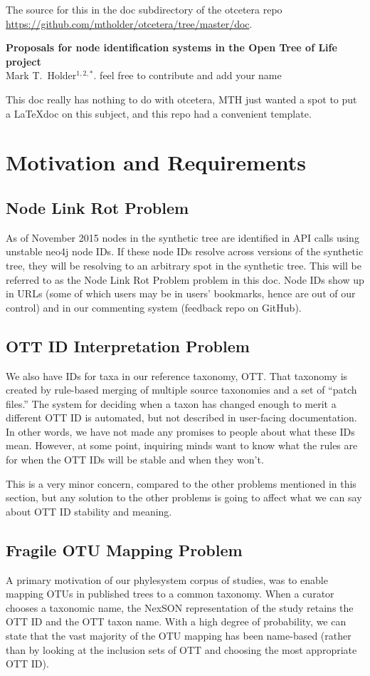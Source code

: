 \documentclass[11pt]{article}
\newcommand{\nodeLinkRot}{Node Link Rot Problem\xspace}
\newcommand{\ottIdInterpretation}{OTT ID Interpretation Problem\xspace}
\newcommand{\fragileOTUMapping}{Fragile OTU Mapping Problem\xspace}
\begin{document}
The source for this in the doc subdirectory of the otcetera
    repo \url{https://github.com/mtholder/otcetera/tree/master/doc}.
\begin{center}
    {\bf Proposals for node identification systems in the Open Tree of Life project} \\
{Mark T.~Holder$^{1,2,\ast}$. feel free to contribute and add your name}
\end{center}
This doc really has nothing to do with otcetera, MTH just wanted a spot to
put a \LaTeX doc on this subject, and this repo had a convenient template.

\tableofcontents
\section{Motivation and Requirements}
\subsection{\nodeLinkRot}
As of November 2015 nodes in the synthetic tree are identified in API calls
    using unstable neo4j node IDs.
If these node IDs resolve across versions of the synthetic tree, they will be
    resolving to an arbitrary spot in the synthetic tree.
This will be referred to as the \nodeLinkRot problem in this doc.
Node IDs show up in URLs (some of which users may be in users' bookmarks, hence
    are out of our control) and in our commenting system (feedback repo on GitHub).

\subsection{\ottIdInterpretation}
We also have IDs for taxa in our reference taxonomy, OTT.
That taxonomy is created by rule-based merging of multiple source taxonomies and
    a set of ``patch files.''
The system for deciding when a taxon has changed enough to merit a different OTT ID
    is automated, but not described in user-facing documentation.
In other words, we have not made any promises to people about what these IDs mean.
However, at some point, inquiring minds want to know what the rules are for when
  the OTT IDs will be stable and when they won't.

This is a very minor concern, compared to the other problems mentioned in this section,
  but any solution to the other problems is going to affect what we can say 
  about OTT ID stability and meaning.

\subsection{\fragileOTUMapping}
A primary motivation of our phylesystem corpus of studies, was to enable
  mapping OTUs in published trees to a common taxonomy.
When a curator chooses a taxonomic name, the NexSON representation of the study
  retains the OTT ID and the OTT taxon name.
With a high degree of probability, we can state that the vast majority of the 
  OTU mapping has been name-based (rather than by looking at the inclusion
    sets of OTT and choosing the most appropriate OTT ID).
\end{document}
